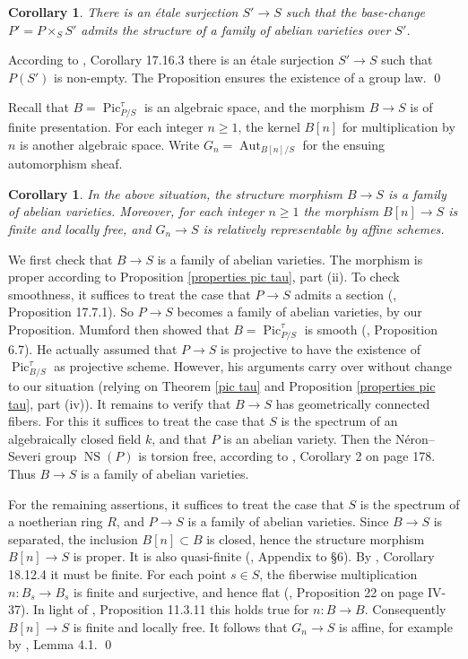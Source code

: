 \documentclass[oneside, 12pt]{amsart}
\newcommand\mylabel[1]{\label{#1}\marginpar{\raggedright\vspace{-1ex}\medskip\medskip\footnotesize \tt #1}}
\renewcommand\mylabel[1]{\label{#1}}
\newtheorem{corollary}[theorem]{Corollary}
\theoremstyle{definition}
\theoremstyle{remark}
\newcommand{\Aut}{\operatorname{Aut}}
\newcommand{\NS}{\operatorname{NS}}
\newcommand{\Pic}{\operatorname{Pic}}
\newcommand{\ra}{\rightarrow}
\begin{document}
\begin{corollary}
\mylabel{etale surjection}
There is an \'etale surjection $S'\ra S$ such that the base-change $P'=P\times_SS'$ admits the structure of 
a family of abelian varieties over $S'$.
\end{corollary}

\proof
According to \cite{EGA IVd}, Corollary 17.16.3 there is an \'etale surjection $S'\ra S$ such that $P(S')$ is non-empty.
The Proposition ensures the existence of a group law.
\qed

\medskip
Recall that $B=\Pic^\tau_{P/S}$ is an algebraic space, and the morphism $B\ra S$ is of finite presentation. For each integer $n\geq 1$,
the kernel $B[n]$ for multiplication by $n$ is another algebraic space. 
Write $G_n=\Aut_{B[n]/S}$ for the ensuing automorphism sheaf.

\begin{corollary}
\mylabel{relative affine}
In the above situation, the structure morphism $B\ra S$ is a family of abelian varieties. 
Moreover,  for each integer $n\geq 1$ the   morphism  $B[n]\ra S$ is finite and  locally free,
and   $G_n\ra S$ is relatively representable by affine schemes. 
\end{corollary}

\proof
We first check that $B\ra S$ is a family of abelian varieties.
The  morphism is proper  according to Proposition \ref{properties pic tau}, part (ii).
To check smoothness, it suffices to treat the case that  $P\ra S$ admits a section (\cite{EGA IVd}, Proposition 17.7.1).
So $P\ra S$ becomes a family of abelian varieties, by our Proposition.
Mumford then showed   that $B=\Pic^\tau_{P/S}$ is smooth (\cite{Mumford; Fogarty; Kirwan 1993}, Proposition 6.7).
He actually assumed that $P\ra S$ is projective to have the existence of $\Pic^\tau_{B/S}$ as   projective scheme.
However, his arguments   carry over without change to our situation (relying on Theorem \ref{pic tau} and Proposition \ref{properties pic tau}, part (iv)).
It remains to verify that $B\ra S$ has geometrically connected fibers.
For this it suffices to treat the case that $S$ is the spectrum of an algebraically closed field $k$, and
that $P$ is an abelian variety.  Then the N\'eron--Severi group
$\NS(P)$ is torsion free, according to \cite{Mumford 1970}, Corollary 2 on page 178.
Thus $B\ra S$ is a family of abelian varieties.

For the remaining assertions, it suffices to treat the case that $S$ is the spectrum of a noetherian ring $R$,
and $P\ra S$ is a family of abelian varieties. Since $B\ra S$ is separated, the inclusion $B[n]\subset B$ is closed,
hence the structure morphism $B[n]\ra S$ is proper. It is also quasi-finite (\cite{Mumford 1970},
Appendix to \S 6).
By \cite{EGA IVd}, Corollary 18.12.4   it must be finite.
For each point $s\in S$, the fiberwise multiplication $n:B_s\ra B_s$ is finite and surjective,
and hence flat (\cite{Serre 1965}, Proposition 22 on page IV-37).
In light of \cite{EGA IVc}, Proposition 11.3.11 this holds true for $n:B\ra B$.
Consequently $B[n]\ra S$ is finite and locally free.
It follows that $G_n\ra S$ is affine, for example by \cite{Lorenzini; Schroeer 2020}, Lemma 4.1.
\qed
\end{document}
